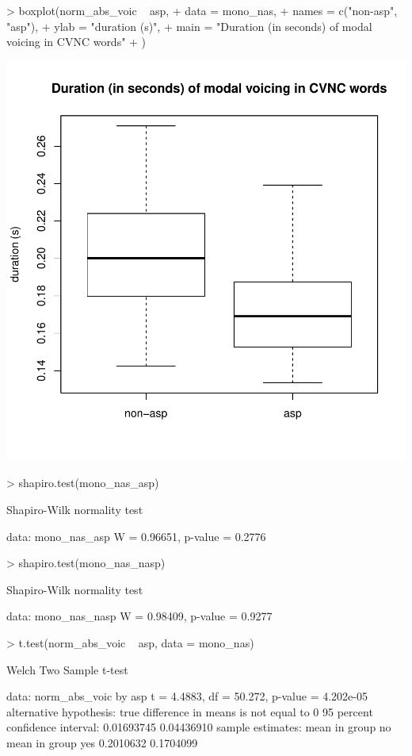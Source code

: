 \documentclass[a4paper,11pt]{article}
\begin{document}
\begin{Schunk}
\begin{Sinput}
> boxplot(norm_abs_voic ~ asp,
+         data = mono_nas,
+         names = c("non-asp", "asp"),
+         ylab = "duration (s)",
+         main = "Duration (in seconds) of modal voicing in CVNC words"
+         )
\end{Sinput}
\end{Schunk}
\includegraphics{analysis-012}

\begin{Schunk}
\begin{Sinput}
> shapiro.test(mono_nas_asp)
\end{Sinput}
\begin{Soutput}
	Shapiro-Wilk normality test

data:  mono_nas_asp
W = 0.96651, p-value = 0.2776
\end{Soutput}
\begin{Sinput}
> shapiro.test(mono_nas_nasp)
\end{Sinput}
\begin{Soutput}
	Shapiro-Wilk normality test

data:  mono_nas_nasp
W = 0.98409, p-value = 0.9277
\end{Soutput}
\begin{Sinput}
> t.test(norm_abs_voic ~ asp, data = mono_nas)
\end{Sinput}
\begin{Soutput}
	Welch Two Sample t-test

data:  norm_abs_voic by asp
t = 4.4883, df = 50.272, p-value = 4.202e-05
alternative hypothesis: true difference in means is not equal to 0
95 percent confidence interval:
 0.01693745 0.04436910
sample estimates:
 mean in group no mean in group yes 
        0.2010632         0.1704099 
\end{Soutput}
\end{Schunk}
\end{document}
